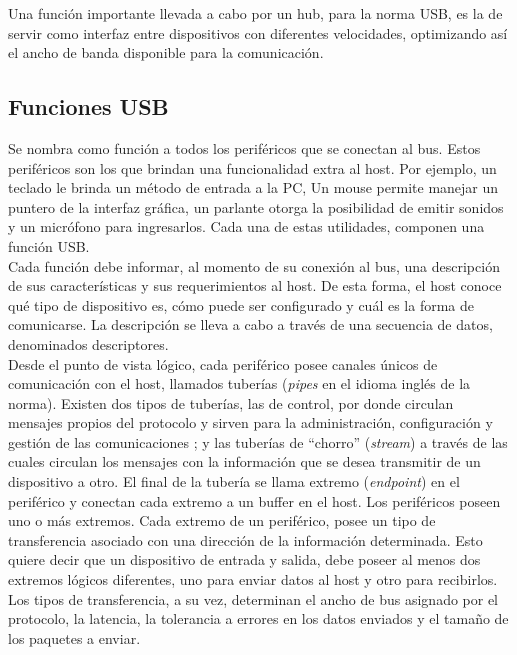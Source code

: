 	Una función importante llevada a cabo por un hub, para la norma USB, es la de servir como interfaz entre dispositivos con diferentes velocidades, optimizando así el ancho de banda disponible para la comunicación.\\
	
\subsection{Funciones USB}
	Se nombra como función a todos los periféricos que se conectan al bus. Estos periféricos son los que brindan una funcionalidad extra al host. Por ejemplo, un teclado le brinda un método de entrada a la PC, Un mouse permite manejar un puntero de la interfaz gráfica, un parlante otorga la posibilidad de emitir sonidos y un micrófono para ingresarlos. Cada una de estas utilidades, componen una función USB.\\
	
	Cada función debe informar, al momento de su conexión al bus, una descripción de sus características y sus requerimientos al host. De esta forma, el host conoce qué tipo de dispositivo es, cómo puede ser configurado y cuál es la forma de comunicarse. La descripción se lleva a cabo a través de una secuencia de datos, denominados descriptores.\\
	
	Desde el punto de vista lógico, cada periférico posee canales únicos de comunicación con el host, llamados tuberías ({\it pipes} en el idioma inglés de la norma). Existen dos tipos de tuberías, las de control, por donde circulan mensajes propios del protocolo y sirven para la administración, configuración y gestión de las comunicaciones ; y las tuberías de ``chorro'' ({\it stream}) a través de las cuales circulan los mensajes con la información que se desea transmitir de un dispositivo a otro. El final de la tubería se llama extremo ({\it endpoint}) en el periférico y conectan cada extremo a un buffer en el host. Los periféricos poseen uno o más extremos. Cada extremo de un periférico, posee un tipo de transferencia asociado con una dirección de la información determinada. Esto quiere decir que un dispositivo de entrada y salida, debe poseer al menos dos extremos lógicos diferentes, uno para enviar datos al host y otro para recibirlos. Los tipos de transferencia, a su vez, determinan el ancho de bus asignado por el protocolo, la latencia, la tolerancia a errores en los datos enviados y el tamaño de los paquetes a enviar.\\
	